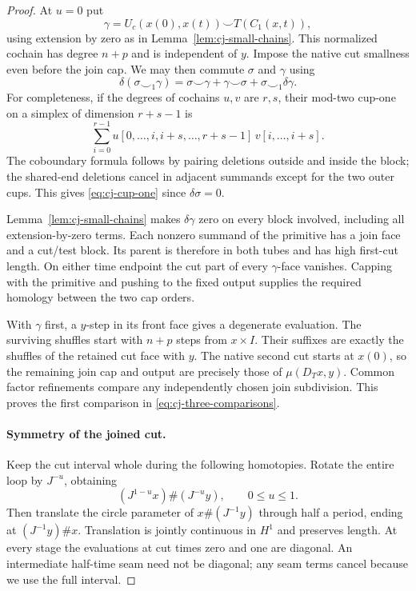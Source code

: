 \begin{proof}
At $u=0$ put
\[
 \gamma=U_c(x(0),x(t))\smile T(C_1(x,t)),
\]
using extension by zero as in Lemma~\ref{lem:cj-small-chains}.
This normalized cochain has degree $n+p$ and is independent of
$y$.  Impose the native cut smallness even before the join cap.
We may then commute $\sigma$ and $\gamma$ using
\begin{equation}\label{eq:cj-cup-one}
 \delta(\sigma\smile_1\gamma)
 =\sigma\smile\gamma+\gamma\smile\sigma
       +\sigma\smile_1\delta\gamma.
\end{equation}
For completeness, if the degrees of cochains $u,v$ are $r,s$,
their mod-two cup-one on a simplex of dimension $r+s-1$ is
\[
 \sum_{i=0}^{r-1}
 u[0,\ldots,i,i+s,\ldots,r+s-1]\,
 v[i,\ldots,i+s].
\]
The coboundary formula follows by pairing deletions outside and
inside the block; the shared-end deletions cancel in adjacent
summands except for the two outer cups.  This gives
\eqref{eq:cj-cup-one} since $\delta\sigma=0$.

Lemma~\ref{lem:cj-small-chains} makes $\delta\gamma$ zero
on every block involved, including all extension-by-zero terms.
Each nonzero summand of the primitive has a join face and a
cut/test block.  Its parent is therefore in both tubes and has
high first-cut length.  On either time endpoint the cut part of
every $\gamma$-face vanishes.  Capping with the primitive and
pushing to the fixed output supplies the required homology
between the two cap orders.

With $\gamma$ first, a $y$-step in its front face gives a
degenerate evaluation.  The surviving shuffles start with
$n+p$ steps from $x\times I$.  Their suffixes are exactly
the shuffles of the retained cut face with $y$.  The native
second cut starts at $x(0)$, so the remaining join cap and
output are precisely those of $\mu(D_Tx,y)$.  Common factor
refinements compare any independently chosen join subdivision.
This proves the first comparison in
\eqref{eq:cj-three-comparisons}.

\paragraph{Symmetry of the joined cut.}
Keep the cut interval whole during the following homotopies.
Rotate the entire loop by $J^{-u}$, obtaining
\[
 (J^{1-u}x)\#(J^{-u}y),\qquad 0\le u\le1.
\]
Then translate the circle parameter of $x\#(J^{-1}y)$
through half a period, ending at $(J^{-1}y)\#x$.
Translation is jointly continuous in $H^1$ and preserves length.
At every stage the evaluations at cut times zero and one are
diagonal.  An intermediate half-time seam need not be diagonal;
any seam terms cancel because we use the full interval.


\end{proof}

